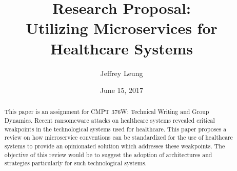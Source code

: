 \documentclass[10pt, oneside, letterpaper]{article}
\title{\textbf{Research Proposal:\\Utilizing Microservices for Healthcare Systems}}
\author{Jeffrey Leung}
\affil{Simon Fraser University}
\date{June 15, 2017}
\begin{document}
	\maketitle

	\begin{abstract}
		This paper is an assignment for CMPT 376W: Technical Writing and Group Dynamics. Recent ransomeware attacks on healthcare systems revealed critical weakpoints in the technological systems used for healthcare. This paper proposes a review on how microservice conventions can be standardized for the use of healthcare systems to provide an opinionated solution which addresses these weakpoints. The objective of this review would be to suggest the adoption of architectures and strategies particularly for such technological systems.
	\end{abstract}
\end{document}
